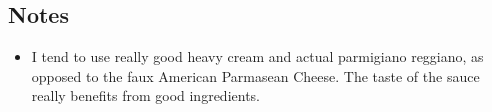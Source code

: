 \begin{multicols}{2}
\begin{enumerate}
\end{enumerate}

\subsection*{Notes}
\begin{itemize}
    \item I tend to use really good heavy cream and actual parmigiano reggiano, as opposed to the faux American Parmasean Cheese. The taste of the sauce really benefits from good ingredients.
\end{itemize}
\end{multicols}
\clearpage